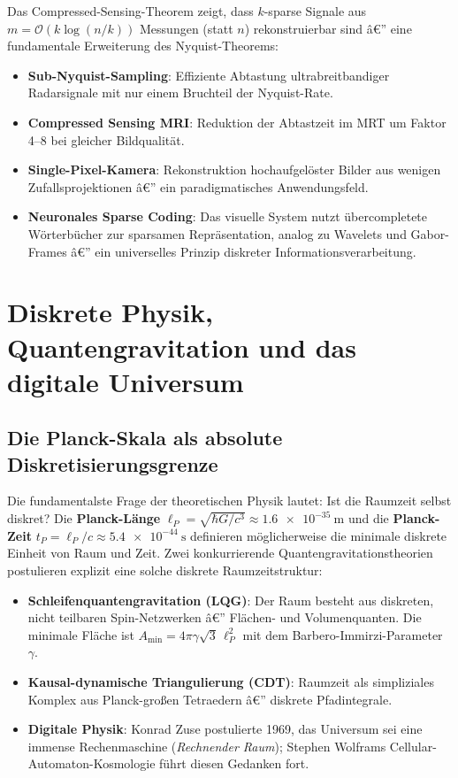 ﻿\documentclass[12pt,a4paper,titlepage]{report}
\begin{document}
Das Compressed-Sensing-Theorem zeigt, dass $k$-sparse Signale aus
$m = \mathcal{O}(k \log(n/k))$ Messungen (statt $n$) rekonstruierbar sind â€”
eine fundamentale Erweiterung des Nyquist-Theorems:
\begin{itemize}[leftmargin=2em]
    \item \textbf{Sub-Nyquist-Sampling}: Effiziente Abtastung ultrabreitbandiger
        Radarsignale mit nur einem Bruchteil der Nyquist-Rate.
    \item \textbf{Compressed Sensing MRI}: Reduktion der Abtastzeit im MRT
        um Faktor 4--8 bei gleicher Bildqualität.
    \item \textbf{Single-Pixel-Kamera}: Rekonstruktion hochaufgelöster Bilder
        aus wenigen Zufallsprojektionen â€” ein paradigmatisches Anwendungsfeld.
    \item \textbf{Neuronales Sparse Coding}: Das visuelle System nutzt
        übercompletete Wörterbücher zur sparsamen Repräsentation, analog zu
        Wavelets und Gabor-Frames â€” ein universelles Prinzip diskreter
        Informationsverarbeitung.
\end{itemize}

\section{Diskrete Physik, Quantengravitation und das digitale Universum}

\subsection{Die Planck-Skala als absolute Diskretisierungsgrenze}

Die fundamentalste Frage der theoretischen Physik lautet: Ist die Raumzeit
selbst diskret? Die \textbf{Planck-Länge}
$\ell_P = \sqrt{\hbar G/c^3} \approx \SI{1.6e-35}{\meter}$
und die \textbf{Planck-Zeit} $t_P = \ell_P/c \approx \SI{5.4e-44}{\second}$
definieren möglicherweise die minimale diskrete Einheit von Raum und Zeit.
Zwei konkurrierende Quantengravitationstheorien postulieren explizit eine
solche diskrete Raumzeitstruktur:
\begin{itemize}[leftmargin=2em]
    \item \textbf{Schleifenquantengravitation (LQG)}: Der Raum besteht aus
        diskreten, nicht teilbaren Spin-Netzwerken â€” Flächen- und
        Volumenquanten. Die minimale Fläche ist $ A_{\min} = 4\pi\gamma\sqrt{3}\,\ell_P^2$
        mit dem Barbero-Immirzi-Parameter $\gamma$.
    \item \textbf{Kausal-dynamische Triangulierung (CDT)}: Raumzeit als
        simpliziales Komplex aus Planck-großen Tetraedern â€” diskrete Pfadintegrale.
    \item \textbf{Digitale Physik}: Konrad Zuse postulierte 1969, das Universum
        sei eine immense Rechenmaschine (\emph{Rechnender Raum}); Stephen Wolframs
        Cellular-Automaton-Kosmo\-logie führt diesen Gedanken fort.
\end{itemize}
\end{document}
